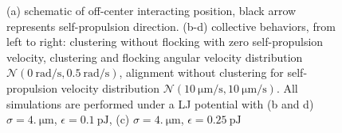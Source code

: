 \documentclass[a4paper, notitlepage]{report} %
\begin{document}
	\begin{figure}[htp]
		\centering
		
		\caption{(a) schematic of off-center interacting position, black arrow represents self-propulsion direction. (b-d) collective behaviors, from left to right: clustering without flocking with zero self-propulsion velocity, clustering and flocking angular velocity distribution $\mathcal{N}(\SI{0}{\radian\per\second}, \SI{0.5}{\radian\per\second})$, alignment without clustering for self-propulsion velocity distribution $\mathcal{N}(\SI{10}{\um\per\second}, \SI{10}{\um\per\second})$. All simulations are performed under a LJ potential with (b and d) $\sigma = \SI{4.}{\um}$, $\epsilon = \SI{0.1}{\pico\joule}$, (c) $\sigma = \SI{4.}{\um}$, $\epsilon = \SI{0.25}{\pico\joule}$}
	\end{figure}
	
	\printbibliography
\end{document}
